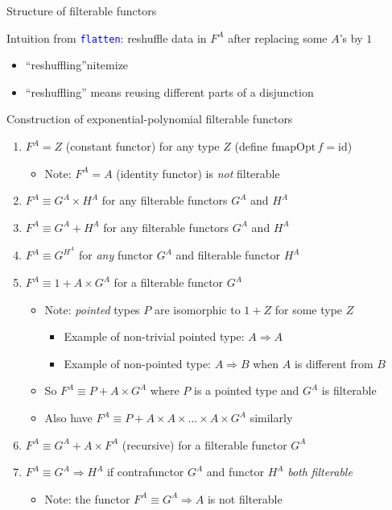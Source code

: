 \documentclass[english]{beamer}
\begin{document}
\begin{frame}{Structure of filterable functors}

Intuition from \texttt{\textcolor{blue}{\footnotesize{}flatten}}:
reshuffle data in $F^{A}$ after replacing some $A$'s by $1$
\begin{itemize}
\item ``reshuffling''n{itemize}
\item ``reshuffling'' means reusing different parts of a disjunction
\end{itemize}
Construction of exponential-polynomial filterable functors 
\begin{enumerate}
\item $F^{A}=Z$ (constant functor) for any type $Z$ (define $\text{fmapOpt}\,f=\text{id}$)
\begin{itemize}
\item Note: $F^{A}=A$ (identity functor) is \emph{not} filterable
\end{itemize}
\item $F^{A}\equiv G^{A}\times H^{A}$ for any filterable functors $G^{A}$
and $H^{A}$
\item $F^{A}\equiv G^{A}+H^{A}$ for any filterable functors $G^{A}$ and
$H^{A}$
\item $F^{A}\equiv G^{H^{A}}$ for \emph{any} functor $G^{A}$ and filterable
functor $H^{A}$
\item $F^{A}\equiv1+A\times G^{A}$ for a filterable functor $G^{A}$
\begin{itemize}
\item Note: \emph{pointed} types $P$ are isomorphic to $1+Z$ for some
type $Z$
\begin{itemize}
\item Example of non-trivial pointed type: $A\Rightarrow A$
\item Example of non-pointed type: $A\Rightarrow B$ when $A$ is different
from $B$
\end{itemize}
\item So $F^{A}\equiv P+A\times G^{A}$ where $P$ is a pointed type and
$G^{A}$ is filterable
\item Also have $F^{A}\equiv P+A\times A\times...\times A\times G^{A}$
similarly
\end{itemize}
\item $F^{A}\equiv G^{A}+A\times F^{A}$ (recursive) for a filterable functor
$G^{A}$
\item $F^{A}\equiv G^{A}\Rightarrow H^{A}$ if\emph{ }contrafunctor $G^{A}$
and functor $H^{A}$ \emph{both} \emph{filterable}
\begin{itemize}
\item Note: the functor $F^{A}\equiv G^{A}\Rightarrow A$ is not filterable
\end{itemize}
\end{enumerate}
\end{frame}
\end{document}
